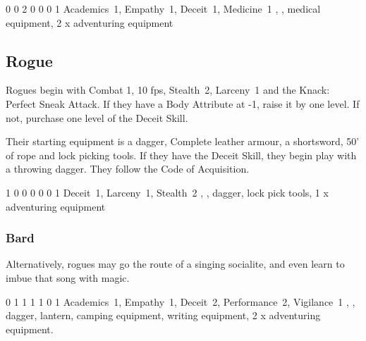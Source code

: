 
{0}%
{0}%
{{2}%
{0}%
{0}}%
{0}%
{1}%
{Academics~1, Empathy~1, Deceit~1, Medicine~1
\knacks{\combatcaster}
}%
{\quarterstaff, \partialchain, medical equipment, 2 x adventuring equipment}%
{\addtocounter{fp}{5}}

\subsection{Rogue}

Rogues begin with Combat 1, 10 \glspl{fp}, Stealth~2, Larceny~1 and the Knack: Perfect Sneak Attack.
If they have a Body Attribute at -1, raise it by one level.
If not, purchase one level of the Deceit Skill.

Their starting equipment is a dagger, Complete leather armour, a shortsword, 50' of rope and lock picking tools.
If they have the Deceit Skill, they begin play with a throwing dagger.
They follow the Code of Acquisition.


{1}%
{0}%
{{0}%
{0}%
{0}}%
{0}%
{1}%
{Deceit~1, Larceny~1, Stealth~2\knacks{\perfectsneakattack}}%
{\longsword, \completeleather, dagger, lock pick tools, 1 x adventuring equipment}%
{\addtocounter{fp}{5}}

\subsubsection{Bard}

Alternatively, rogues may go the route of a singing socialite, and even learn to imbue that song with magic.


{0}%
{1}%
{{1}%
{1}%
{1}}%
{0}%
{1}%
{Academics~1, Empathy~1, Deceit~2, Performance~2, Vigilance~1
}%
{\longsword, \partialleather, dagger, lantern, camping equipment, writing equipment, 2 x adventuring equipment.
}%
{\addtocounter{fp}{10}}

